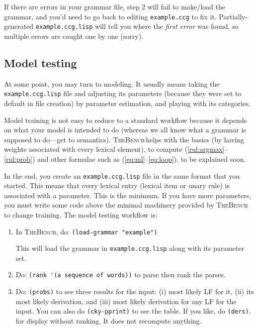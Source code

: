 \documentclass[11pt]{article}
\newcommand{\tool}{\textsc{TheBench}}
\begin{document}
\noindent If there are errors in your grammar file, step 2  will fail to make/load the grammar, and you'd need to go back to editing \verb|example.ccg| to fix it.
Partially-generated \verb|example.ccg.lisp| will tell you where the \emph{first error} was found, so multiple errors are caught one by one (sorry). 

\subsection{Model testing}\label{sec:models}
At some point, you may turn to modeling. {It usually means taking the} \verb|example.ccg.lisp| {file and  adjusting its parameters (because they were set to default in file creation) by parameter estimation, and playing with its
categories.} 

Model training is not easy to reduce to a standard workflow  because it depends on what your model is intended to do (whereas
we all know what a grammar is supposed to do---get to semantics). \tool\,helps with the basics (by having weights associated with every lexical element), to compute (\ref{rul:argmax}--\ref{rul:prob}) and other formulae such as
(\ref{eq:ml}--\ref{eq:loop}), to be explained soon.

In the end, you  create an \verb|example.ccg.lisp| file in the same format that you started. This means that every lexical entry (lexical item or unary rule) is associated with a parameter. This is the minimum. If you have more parameters, you must
write some code above the minimal machinery provided by \tool\,to change training. The model testing workflow is:
\begin{enumerate}
\setlength{\itemsep}{0pt}
\setlength{\parskip}{0pt}
\setlength{\parsep}{0pt} 
\item In \tool, do: \verb|(load-grammar "example")| 
\par {This will load the grammar in} \verb|example.ccg.lisp|
{along with its parameter set.}
\item Do: \verb|(rank '(a sequence of words))| to parse then rank the parses.
\item Do: \verb|(probs)| to see three results for the input: (i) most likely LF for it, (ii) its most likely derivation, and (iii) most likely derivation for any LF for the input. You can also do \verb|(cky-pprint)| to see the  table. 
If you like, do \verb|(ders)|, for display without ranking. It does not recompute anything.
\end{enumerate}
\end{document}
